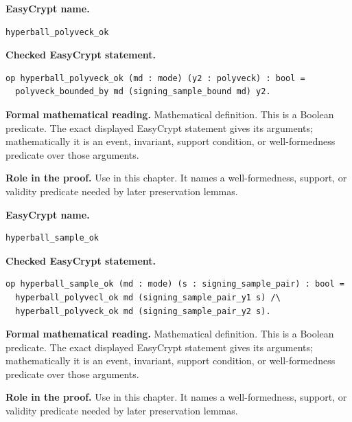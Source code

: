\begin{formaldefinition}
\noindent\textbf{EasyCrypt name.}
\begin{lstlisting}[language=EasyCrypt,basicstyle=\ttfamily\scriptsize]
hyperball_polyveck_ok
\end{lstlisting}
\noindent\textbf{Checked EasyCrypt statement.}
\begin{lstlisting}[language=EasyCrypt,basicstyle=\ttfamily\scriptsize]
op hyperball_polyveck_ok (md : mode) (y2 : polyveck) : bool =
  polyveck_bounded_by md (signing_sample_bound md) y2.
\end{lstlisting}
\noindent\textbf{Formal mathematical reading.}
Mathematical definition. This is a Boolean predicate.  The exact displayed EasyCrypt statement gives its arguments; mathematically it is an event, invariant, support condition, or well-formedness predicate over those arguments.

\noindent\textbf{Role in the proof.}
Use in this chapter. It names a well-formedness, support, or validity predicate needed by later preservation lemmas.

\end{formaldefinition}

\begin{formaldefinition}
\noindent\textbf{EasyCrypt name.}
\begin{lstlisting}[language=EasyCrypt,basicstyle=\ttfamily\scriptsize]
hyperball_sample_ok
\end{lstlisting}
\noindent\textbf{Checked EasyCrypt statement.}
\begin{lstlisting}[language=EasyCrypt,basicstyle=\ttfamily\scriptsize]
op hyperball_sample_ok (md : mode) (s : signing_sample_pair) : bool =
  hyperball_polyvecl_ok md (signing_sample_pair_y1 s) /\
  hyperball_polyveck_ok md (signing_sample_pair_y2 s).
\end{lstlisting}
\noindent\textbf{Formal mathematical reading.}
Mathematical definition. This is a Boolean predicate.  The exact displayed EasyCrypt statement gives its arguments; mathematically it is an event, invariant, support condition, or well-formedness predicate over those arguments.

\noindent\textbf{Role in the proof.}
Use in this chapter. It names a well-formedness, support, or validity predicate needed by later preservation lemmas.

\end{formaldefinition}

